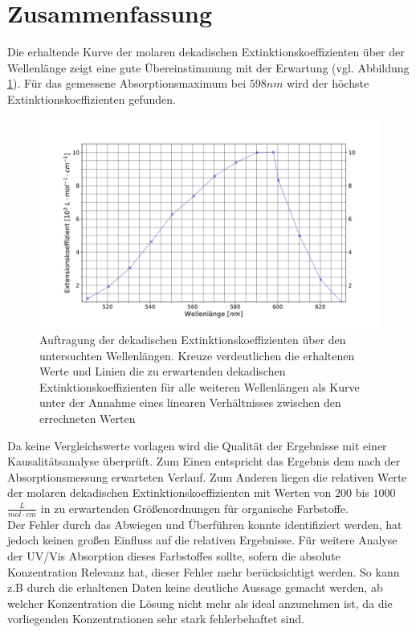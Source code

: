 \section{Zusammenfassung}
Die erhaltende Kurve der molaren dekadischen Extinktionskoeffizienten über der Wellenlänge zeigt eine gute Übereinstimmung mit der Erwartung (vgl. Abbildung \ref{fig:ExtKoeffsZsm}). Für das gemessene Absorptionsmaximum bei $598 \si{nm}$ wird der höchste Extinktionskoeffizienten gefunden. 
\begin{figure}[H]
	\centering	
	\begin{minipage}{1\textwidth}
		\includegraphics[width=\columnwidth]{Rohdaten/Extkoeff.pdf}	
		\caption{Auftragung der dekadischen Extinktionskoeffizienten über den untersuchten Wellenlängen. Kreuze verdeutlichen die erhaltenen Werte und Linien die zu erwartenden dekadischen Extinktionskoeffizienten für alle weiteren Wellenlängen als Kurve unter der Annahme eines linearen Verhältnisses zwischen den errechneten Werten}
		\label{fig:ExtKoeffsZsm}
\end{minipage}
\end{figure}
Da keine Vergleichswerte vorlagen wird die Qualität der Ergebnisse mit einer Kausalitätsanalyse überprüft. Zum Einen entspricht das Ergebnis dem nach der Absorptionsmessung erwarteten Verlauf. Zum Anderen liegen die relativen Werte der molaren dekadischen Extinktionskoeffizienten mit Werten von $200$ bis $1000$ $\si{\frac{L}{mol\cdot cm}}$ in zu erwartenden Größenordnungen für organische Farbstoffe. \\
Der Fehler durch das Abwiegen und Überführen konnte identifiziert werden, hat jedoch keinen großen Einfluss auf die relativen Ergebnisse. Für weitere Analyse der UV/Vis Absorption dieses Farbstoffes sollte, sofern die absolute Konzentration Relevanz hat, dieser Fehler mehr berücksichtigt werden. So kann z.B durch die erhaltenen Daten keine deutliche Aussage gemacht werden, ab welcher Konzentration die Lösung nicht mehr als ideal anzunehmen ist, da die vorliegenden Konzentrationen sehr stark fehlerbehaftet sind. 
